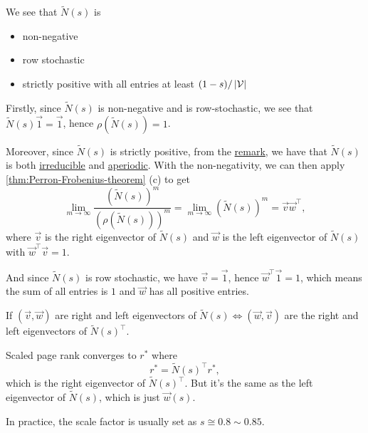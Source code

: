 \begin{note}
	We see that \(\widetilde{N}(s)\) is
	\begin{itemize}
		\item non-negative
		\item row stochastic
		\item strictly positive with all entries at least \((1-s) / \left\vert \mathcal{\MakeUppercase{v}} \right\vert \)
	\end{itemize}
\end{note}
Firstly, since \(\widetilde{N} (s)\) is non-negative and is row-stochastic, we see that \(\widetilde{N} (s)\vec{1} = \vec{1} \), hence
\(\rho(\widetilde{N}(s)) = 1\).

Moreover, since \(\widetilde{N} (s)\) is strictly positive, from the \hyperref[rmk:lec11-1]{remark}, we have that \(\widetilde{N} (s)\) is
both \hyperref[def:irreducible]{irreducible} and \hyperref[def:aperiodic]{aperiodic}. With the non-negativity, we can then apply
\autoref{thm:Perron-Frobenius-theorem} (c) to get
\[
	\lim\limits_{m \to \infty} \frac{(\widetilde{N} (s))^m}{(\rho (\widetilde{N} (s)))^m} = \lim\limits_{m \to \infty} (\widetilde{N} (s))^m = \vec{v} \vec{w} ^{\top},
\]
where \(\vec{v}\) is the right eigenvector of \(\widetilde{N}(s)\) and \(\vec{w}\) is the left eigenvector of \(\widetilde{N}(s)\) with
\(\vec{w}^{\top} \vec{v} = 1\).

And since \(\widetilde{N}(s)\) is row stochastic, we have \(\vec{v} = \vec{1}\), hence \(\vec{w}^{\top}\vec{1} = 1\),
which means the sum of all entries is \(1\) and \(\vec{w}\) has all positive entries.

If \((\vec{v}, \vec{w})\) are right and left eigenvectors of \(\widetilde{N}(s) \iff (\vec{w}, \vec{v})\) are the right and left eigenvectors
of \(\widetilde{N}(s)^{\top}\).

\begin{remark}
	Scaled page rank converges to \(r^{\ast} \) where
	\[
		r^{\ast} = \widetilde{N}(s)^{\top}r^{\ast},
	\]
	which is the right eigenvector of \(\widetilde{N}(s)^{\top}\). But it's the same as the left eigenvector of \(\widetilde{N}(s)\), which is just
	\(\vec{w}(s)\).
\end{remark}

\begin{note}
	In practice, the scale factor is usually set as \(s \cong 0.8 \sim 0.85\).
\end{note}